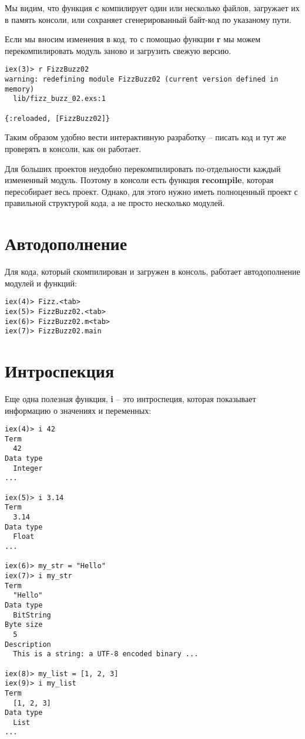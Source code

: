 Мы видим, что функция \textbf{c} компилирует один или несколько файлов, загружает их в память консоли, или сохраняет сгенерированный байт-код по указаному пути. 

Если мы вносим изменения в код, то с помощью функции \textbf{r} мы можем перекомпилировать модуль заново и загрузить свежую версию.

\begin{lstlisting}
iex(3)> r FizzBuzz02
warning: redefining module FizzBuzz02 (current version defined in memory)
  lib/fizz_buzz_02.exs:1

{:reloaded, [FizzBuzz02]}
\end{lstlisting}

Таким образом удобно вести интерактивную разработку -- писать код и тут же проверять в консоли, как он работает. 

Для больших проектов неудобно перекомпилировать по-отдельности каждый измененный модуль. Поэтому в консоли есть функция \textbf{recompile}, которая пересобирает весь проект. Однако, для этого нужно иметь полноценный проект с правильной структурой кода, а не просто несколько модулей.

\section{Автодополнение}

Для кода, который скомпилирован и загружен в консоль, работает автодополнение модулей и функций:

\begin{lstlisting}
iex(4)> Fizz.<tab>
iex(5)> FizzBuzz02.<tab>
iex(6)> FizzBuzz02.m<tab>
iex(7)> FizzBuzz02.main
\end{lstlisting}

\section{Интроспекция}

Еще одна полезная функция, \textbf{i} -- это интроспеция, которая показывает информацию о значениях и переменных:

\begin{lstlisting}
iex(4)> i 42
Term
  42
Data type
  Integer
...

iex(5)> i 3.14
Term
  3.14
Data type
  Float
...

iex(6)> my_str = "Hello"
iex(7)> i my_str
Term
  "Hello"
Data type
  BitString
Byte size
  5
Description
  This is a string: a UTF-8 encoded binary ...

iex(8)> my_list = [1, 2, 3]
iex(9)> i my_list
Term
  [1, 2, 3]
Data type
  List
...
\end{lstlisting}

